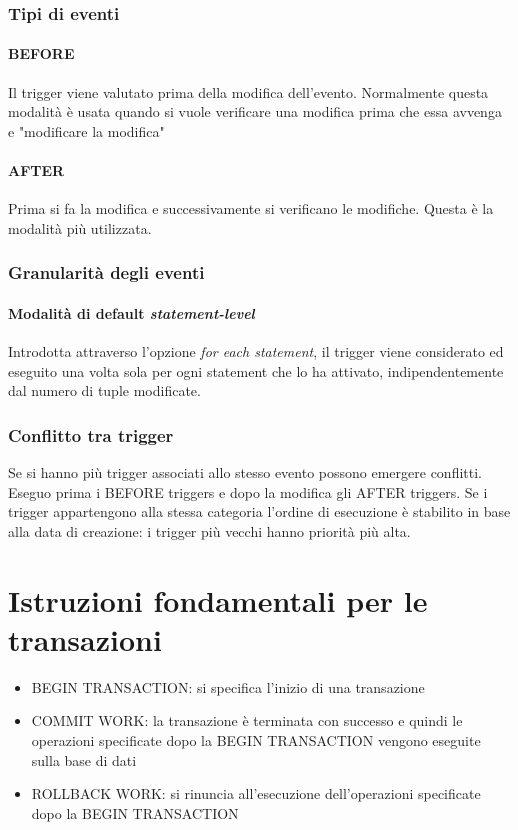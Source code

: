 \subsubsection{Tipi di eventi}
\paragraph{BEFORE} Il trigger viene valutato prima della modifica dell'evento. Normalmente questa modalità è usata quando si vuole verificare una modifica prima che essa avvenga e "modificare la modifica"
\paragraph{AFTER} Prima si fa la modifica e successivamente si verificano le modifiche. Questa è la modalità più utilizzata.
\subsubsection{Granularità degli eventi}
\paragraph{Modalità di default \emph{statement-level}} Introdotta attraverso l'opzione \emph{for each statement}, il trigger viene considerato ed eseguito una volta sola per ogni statement che lo ha attivato, indipendentemente dal numero di tuple modificate.
\subsubsection{Conflitto tra trigger}
Se si hanno più trigger associati allo stesso evento possono emergere conflitti. Eseguo prima i BEFORE triggers e dopo la modifica gli AFTER triggers. Se i trigger appartengono alla stessa categoria l'ordine di esecuzione è stabilito in base alla data di creazione: i trigger più vecchi hanno priorità più alta.
\section{Istruzioni fondamentali per le transazioni}
\begin{itemize}
	\item BEGIN TRANSACTION: si specifica l'inizio di una transazione
	\item COMMIT WORK: la transazione è terminata con successo e quindi le operazioni specificate dopo la BEGIN TRANSACTION vengono eseguite sulla base di dati
	\item ROLLBACK WORK: si rinuncia all'esecuzione dell'operazioni specificate dopo la BEGIN TRANSACTION
\end{itemize}
